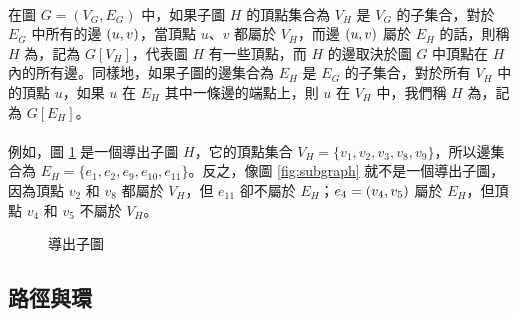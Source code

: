 \documentclass[12pt,a4paper,oneside]{report}
\begin{document}
\begin{CJK}{UTF8}{bkai}
\paragraph{}在圖 $G=(V_G, E_G)$ 中，如果子圖 $H$ 的頂點集合為 $V_H$ 是 $V_G$ 的子集合，對於 $E_G$ 中所有的邊 $({u},{v})$，當頂點 $u$、$v$ 都屬於 $V_H$，而邊 $({u},{v})$ 屬於 $E_H$ 的話，則稱 $H$ 為\textbf{}，記為 $G[V_H]$，代表圖 $H$ 有一些頂點，而 $H$ 的邊取決於圖 $G$ 中頂點在 $H$ 內的所有邊。同樣地，如果子圖的邊集合為 $E_H$ 是 $E_G$ 的子集合，對於所有 $V_H$ 中的頂點 $u$，如果 $u$ 在 $E_H$ 其中一條邊的端點上，則 $u$ 在 $V_H$ 中，我們稱 $H$ 為，記為 $G[E_H]$。
\paragraph{}例如，圖 \ref{fig:subgraph_induced} 是一個導出子圖 $H$，它的頂點集合 $V_H=\{{v_1,v_2,v_3,v_8,v_9}\}$，所以邊集合為 $E_H=\{{e_1,e_2,e_9,e_{10},e_{11}}\}$。反之，像圖 \ref{fig:subgraph} 就不是一個導出子圖，因為頂點 $v_2$ 和 $v_8$ 都屬於 $V_H$，但 $e_{11}$ 卻不屬於 $E_H$；$e_4=({v_4},{v_5})$ 屬於 $E_H$，但頂點 $v_4$ 和 $v_5$ 不屬於 $V_H$。
\begin{figure}[h!]
\centering
{}
\caption{導出子圖}
\label{fig:subgraph_induced}
\end{figure}

\subsection{路徑與環}

\end{CJK}
\end{document}
